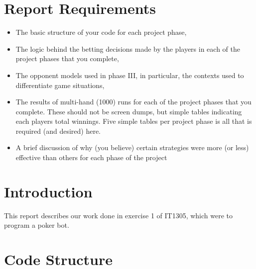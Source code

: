 \documentclass[titlepage]{article}
\begin{document}
\section*{Report Requirements}
\begin{itemize}
\item The basic structure of your code for each project phase,

\item The logic behind the betting decisions made by the players in each of the project phases that you complete,

\item The opponent models used in phase III, in particular, the contexts used to differentiate game situations,

\item The results of multi-hand (1000) runs for each of the project phases that you complete. These should not be screen dumps, but simple tables indicating each players total winnings. Five simple tables per project phase is all that is required (and desired) here.

\item A brief discussion of why (you believe) certain strategies were more (or less) effective than others for
each phase of the project
\end{itemize}

\newpage

\section{Introduction}
	This report describes our work done in exercise 1 of IT1305, which were to program a poker bot. 
	
\section{Code Structure}
\end{document}
